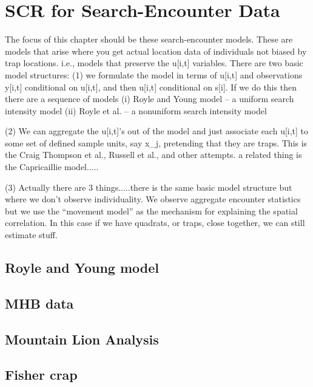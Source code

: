 \chapter{SCR for Search-Encounter Data}
\label{chapt.searchencounter}

\vspace{0.3cm}


The focus of this chapter should be these search-encounter models. These are
models that arise where you get actual location data of individuals not
biased by trap locations. i.e., models that preserve the u[i,t] variables.
There are two basic model structures:
 (1) we formulate the model in terms of u[i,t] and observations y[i,t]
 conditional on u[i,t], and then u[i,t] conditional on s[i].
  If we do this then there are a sequence of models 
   (i) Royle and Young model -- a uniform search intensity model
  (ii) Royle et al. -- a nonuniform search intensity model
  
 (2) We can aggregate the u[i,t]'s out of the model and just associate
 each u[i,t] to some set of defined sample units, say x_{j}, pretending
 that they are traps. This is the Craig Thompson et al.,  Russell et al., 
 and other attempts.  a related thing is the Capricaillie model.....
 
 (3) Actually there are 3 things.....there is the same basic model structure
 but where we don't observe individuality. We observe aggregate encounter
 statistics but we use the ``movement model'' as the mechanism for explaining
 the spatial correlation.  In this case if we have quadrats, or traps,
 close together, we can still estimate stuff. 


\section{Royle and Young model}

\section{MHB data}

\section{Mountain Lion Analysis}

\section{Fisher crap}

